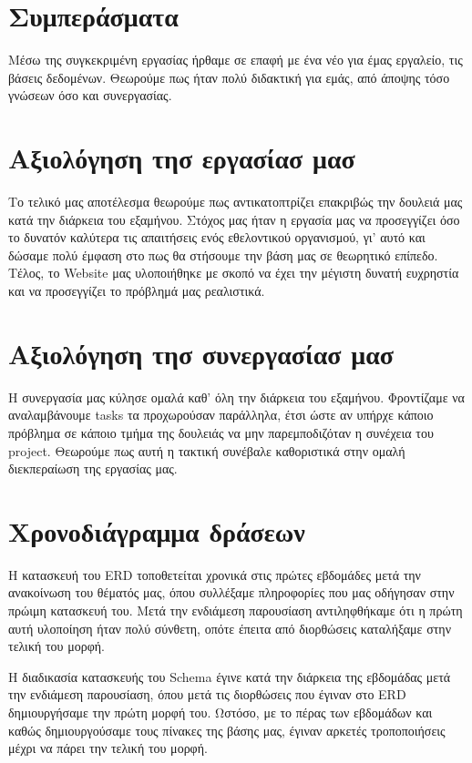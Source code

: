 \documentclass[manuscript,screen,review]{acmart}
\newcommand{\en}[1]{\foreignlanguage{english}{#1}}
\begin{document}
\section{Συμπεράσματα}
Μέσω της συγκεκριμένη εργασίας ήρθαμε σε επαφή με ένα νέο για έμας εργαλείο, τις βάσεις δεδομένων. Θεωρούμε πως ήταν πολύ διδακτική για εμάς, από άποψης τόσο γνώσεων όσο και συνεργασίας.  

\section{Αξιολόγηση τησ εργασίασ μασ}
Το τελικό μας αποτέλεσμα θεωρούμε πως αντικατοπτρίζει επακριβώς την δουλειά μας κατά την διάρκεια του εξαμήνου. Στόχος μας ήταν η εργασία μας να προσεγγίζει όσο το δυνατόν καλύτερα τις απαιτήσεις ενός εθελοντικού οργανισμού, γι' αυτό και δώσαμε πολύ έμφαση στο πως θα στήσουμε την βάση μας σε θεωρητικό επίπεδο. Τέλος, το \en{Website} μας υλοποιήθηκε με σκοπό να έχει την μέγιστη δυνατή ευχρηστία και να προσεγγίζει το πρόβλημά μας ρεαλιστικά. 

\section{Αξιολόγηση τησ συνεργασίασ μασ}
Η συνεργασία μας κύλησε ομαλά καθ' όλη την διάρκεια του εξαμήνου. Φροντίζαμε να αναλαμβάνουμε \en{tasks} τα προχωρούσαν παράλληλα, έτσι ώστε αν υπήρχε κάποιο πρόβλημα σε κάποιο τμήμα της δουλειάς να μην παρεμποδιζόταν η συνέχεια του \en{project}. Θεωρούμε πως αυτή η τακτική συνέβαλε καθοριστικά στην ομαλή διεκπεραίωση της εργασίας μας.

\section{Χρονοδιάγραμμα δράσεων}

Η κατασκευή του \en{ERD} τοποθετείται χρονικά στις πρώτες εβδομάδες μετά την ανακοίνωση του θέματός μας, όπου συλλέξαμε πληροφορίες που μας οδήγησαν στην πρώιμη κατασκευή του. Μετά την ενδιάμεση παρουσίαση αντιληφθήκαμε ότι η πρώτη αυτή υλοποίηση ήταν πολύ σύνθετη, οπότε έπειτα από διορθώσεις καταλήξαμε στην τελική του μορφή.

H διαδικασία κατασκευής του \en{Schema} έγινε κατά την διάρκεια της εβδομάδας μετά την ενδιάμεση παρουσίαση, όπου μετά τις διορθώσεις που έγιναν στο \en{ERD} δημιουργήσαμε την πρώτη μορφή του. Ωστόσο, με το πέρας των εβδομάδων και καθώς δημιουργούσαμε τους πίνακες της βάσης μας, έγιναν αρκετές τροποποιήσεις μέχρι να πάρει την τελική του μορφή.
\end{document}
